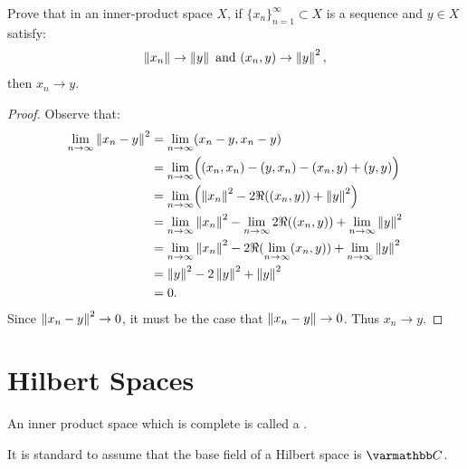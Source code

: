 \begin{exercise}
Prove that in an inner-product space $X$, if $\{x_n\}_{n = 1}^\infty \subset X$ is a sequence and $y \in X$ satisfy:
    \begin{equation*}
    \begin{split}
        \left\lVert x_n \right\rVert \rightarrow \left\lVert y \right\rVert \text{ and }(x_n,y) \rightarrow \left\lVert y \right\rVert^2,
    \end{split}
    \end{equation*}
then $x_n \rightarrow y$.
\end{exercise}
    \begin{proof}
        Observe that:
            \begin{equation*}
            \begin{split}
                \lim_{n \rightarrow \infty} \left\lVert x_n - y \right\rVert^2
                & = \lim_{n \rightarrow \infty} (x_n - y, x_n - y)\\
                & = \lim_{n \rightarrow \infty} \Bigl( (x_n,x_n) - (y,x_n) - (x_n,y) + (y,y) \Bigr) \\
                & = \lim_{n \rightarrow \infty} \Bigl(\left\lVert x_n \right\rVert^2 - 2\Re((x_n,y)) + \left\lVert y \right\rVert^2\Bigr) \\
                & = \lim_{n \rightarrow \infty} \left\lVert x_n \right\rVert^2 - \lim_{n \rightarrow \infty} 2\Re((x_n,y)) + \lim_{n \rightarrow \infty}\left\lVert y \right\rVert^2 \\
                & = \lim_{n \rightarrow \infty} \left\lVert x_n \right\rVert^2 -  2\Re(\lim_{n \rightarrow \infty}(x_n,y)) + \lim_{n \rightarrow \infty}\left\lVert y \right\rVert^2 \\
                & = \left\lVert y \right\rVert^2 - 2 \left\lVert y \right\rVert^2 + \left\lVert y \right\rVert^2 \\
                & = 0.
            \end{split}
            \end{equation*}
        Since $\left\lVert x_n - y \right\rVert^2 \rightarrow 0$, it must be the case that $\left\lVert x_n - y \right\rVert \rightarrow 0$. Thus $x_n \rightarrow y$.
    \end{proof}

\section{Hilbert Spaces}

\begin{definition}
    An inner product space which is complete is called a .
\end{definition}
\begin{remark}
    It is standard to assume that the base field of a Hilbert space is $\bfC$.
\end{remark}

